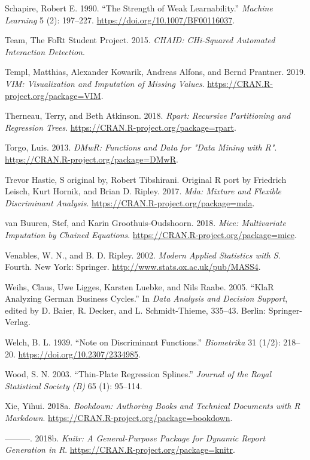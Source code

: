 \documentclass[]{book}
\theoremstyle{plain}
\theoremstyle{definition}
\theoremstyle{definition}
\theoremstyle{definition}
\theoremstyle{definition}
\theoremstyle{remark}
\begin{document}
\leavevmode\hypertarget{ref-schapire1990}{}%
Schapire, Robert E. 1990. ``The Strength of Weak Learnability.'' \emph{Machine Learning} 5 (2): 197--227. \url{https://doi.org/10.1007/BF00116037}.

\leavevmode\hypertarget{ref-R-CHAID}{}%
Team, The FoRt Student Project. 2015. \emph{CHAID: CHi-Squared Automated Interaction Detection}.

\leavevmode\hypertarget{ref-R-VIM}{}%
Templ, Matthias, Alexander Kowarik, Andreas Alfons, and Bernd Prantner. 2019. \emph{VIM: Visualization and Imputation of Missing Values}. \url{https://CRAN.R-project.org/package=VIM}.

\leavevmode\hypertarget{ref-R-rpart}{}%
Therneau, Terry, and Beth Atkinson. 2018. \emph{Rpart: Recursive Partitioning and Regression Trees}. \url{https://CRAN.R-project.org/package=rpart}.

\leavevmode\hypertarget{ref-R-DMwR}{}%
Torgo, Luis. 2013. \emph{DMwR: Functions and Data for "Data Mining with R"}. \url{https://CRAN.R-project.org/package=DMwR}.

\leavevmode\hypertarget{ref-R-mda}{}%
Trevor Hastie, S original by, Robert Tibshirani. Original R port by Friedrich Leisch, Kurt Hornik, and Brian D. Ripley. 2017. \emph{Mda: Mixture and Flexible Discriminant Analysis}. \url{https://CRAN.R-project.org/package=mda}.

\leavevmode\hypertarget{ref-R-mice}{}%
van Buuren, Stef, and Karin Groothuis-Oudshoorn. 2018. \emph{Mice: Multivariate Imputation by Chained Equations}. \url{https://CRAN.R-project.org/package=mice}.

\leavevmode\hypertarget{ref-R-MASS}{}%
Venables, W. N., and B. D. Ripley. 2002. \emph{Modern Applied Statistics with S}. Fourth. New York: Springer. \url{http://www.stats.ox.ac.uk/pub/MASS4}.

\leavevmode\hypertarget{ref-R-klaR}{}%
Weihs, Claus, Uwe Ligges, Karsten Luebke, and Nils Raabe. 2005. ``KlaR Analyzing German Business Cycles.'' In \emph{Data Analysis and Decision Support}, edited by D. Baier, R. Decker, and L. Schmidt-Thieme, 335--43. Berlin: Springer-Verlag.

\leavevmode\hypertarget{ref-welch1939}{}%
Welch, B. L. 1939. ``Note on Discriminant Functions.'' \emph{Biometrika} 31 (1/2): 218--20. \url{https://doi.org/10.2307/2334985}.

\leavevmode\hypertarget{ref-R-mgcv}{}%
Wood, S. N. 2003. ``Thin-Plate Regression Splines.'' \emph{Journal of the Royal Statistical Society (B)} 65 (1): 95--114.

\leavevmode\hypertarget{ref-R-bookdown}{}%
Xie, Yihui. 2018a. \emph{Bookdown: Authoring Books and Technical Documents with R Markdown}. \url{https://CRAN.R-project.org/package=bookdown}.

\leavevmode\hypertarget{ref-R-knitr}{}%
---------. 2018b. \emph{Knitr: A General-Purpose Package for Dynamic Report Generation in R}. \url{https://CRAN.R-project.org/package=knitr}.
\end{document}
